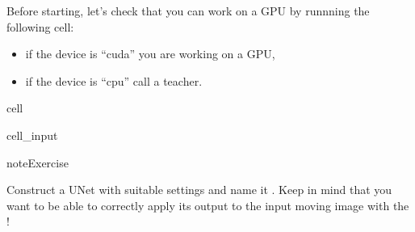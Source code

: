 \documentclass[letterpaper,10pt,english]{jupyterBook}
\begin{document}
\sphinxAtStartPar
{}

\sphinxAtStartPar
Before starting, let’s check that you can work on a GPU by runnning the following cell:
\begin{itemize}
\item {} 
\sphinxAtStartPar
if the device is “cuda” you are working on a GPU,

\item {} 
\sphinxAtStartPar
if the device is “cpu” call a teacher.

\end{itemize}

\begin{sphinxuseclass}{cell}\begin{sphinxVerbatimInput}

\begin{sphinxuseclass}{cell_input}
\begin{sphinxVerbatim}[commandchars=\\\{\}]
 
      
 
      
    \PYG{p}{[}\PYG{p}{]}
      
\end{sphinxVerbatim}

\end{sphinxuseclass}\end{sphinxVerbatimInput}

\end{sphinxuseclass}
\begin{sphinxadmonition}{note}{Exercise}

\sphinxAtStartPar
Construct a U\sphinxhyphen{}Net with suitable settings and name it . Keep in mind that you want to be able to correctly apply its output to the input moving image with the !
\end{sphinxadmonition}
\end{document}
